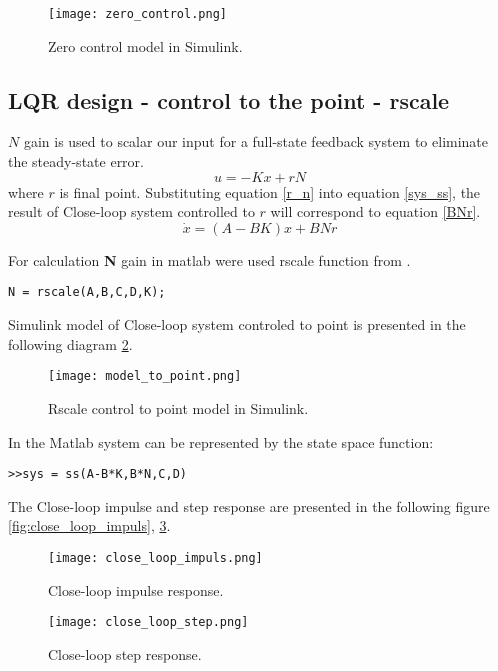 \documentclass[../report.tex]{subfiles}
\begin{document}
\begin{figure}[h]
    \centering
    \texttt{[image: zero\_control.png]}
    \caption{Zero control model in Simulink.}
    \label{fig:zero_control}
\end{figure}

\subsection{LQR design - control to the point - rscale}

$N$ gain is used to scalar our input for a full-state feedback system to 
eliminate the steady-state error.
\begin{equation}\label{r_n}
    u = -Kx + rN
\end{equation} 
where $r$ is final point. Substituting equation \ref{r_n} into equation \ref{sys_ss}, the
result of Close-loop system controlled to $r$ will correspond to equation
\ref{BNr}.
\begin{equation}\label{BNr}
    \dot{x} = (A-BK)x + BNr
\end{equation}

For calculation \textbf{N} gain in matlab were used rscale function from
\cite{rscale}. 
\begin{lstlisting}[frame=single]
N = rscale(A,B,C,D,K);
\end{lstlisting}

Simulink model of Close-loop system controled to point is presented in the following diagram
\ref{fig:model_to_point}.

\begin{figure}[hbt!]
    \centering
    \texttt{[image: model\_to\_point.png]}
    \caption{Rscale control to point model in Simulink.}
    \label{fig:model_to_point}
\end{figure}
In the Matlab system can be represented by the state space function:
\begin{lstlisting}[frame=single]
>>sys = ss(A-B*K,B*N,C,D)
\end{lstlisting}

The Close-loop impulse and step response are presented in the following
figure \ref{fig:close_loop_impuls}, \ref{fig:close_loop_step}.

\begin{figure}[hbt!]
    \centering
    \begin{minipage}{.5\textwidth}
    \centering
    \texttt{[image: close\_loop\_impuls.png]}
    \caption{Close-loop impulse response.}
    \label{fig:close_loop_impuls}
\end{minipage}%
\begin{minipage}{.5\textwidth}
    \centering
    \texttt{[image: close\_loop\_step.png]}
    \caption{Close-loop step response.}
    \label{fig:close_loop_step}
\end{minipage}
\end{figure}
\end{document}
